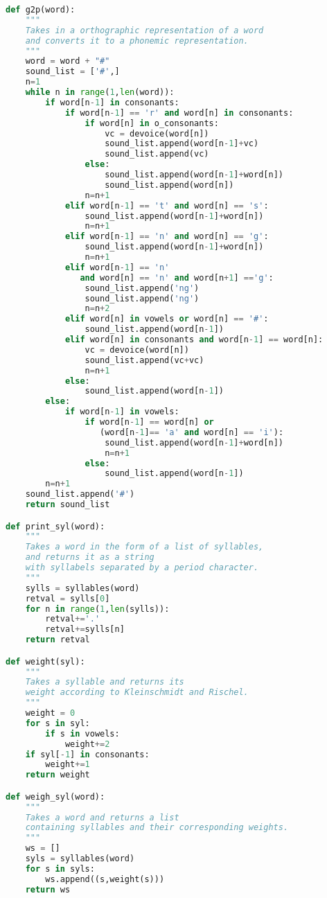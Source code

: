 \documentclass[12pt]{article}
\begin{document}
\begin{lstlisting}[language=Python]
def g2p(word):
    """
    Takes in a orthographic representation of a word
    and converts it to a phonemic representation.
    """
    word = word + "#"
    sound_list = ['#',]
    n=1
    while n in range(1,len(word)):
        if word[n-1] in consonants:
            if word[n-1] == 'r' and word[n] in consonants:
                if word[n] in o_consonants:
                    vc = devoice(word[n])
                    sound_list.append(word[n-1]+vc)
                    sound_list.append(vc)
                else:
                    sound_list.append(word[n-1]+word[n])
                    sound_list.append(word[n])
                n=n+1
            elif word[n-1] == 't' and word[n] == 's':
                sound_list.append(word[n-1]+word[n])
                n=n+1
            elif word[n-1] == 'n' and word[n] == 'g':
                sound_list.append(word[n-1]+word[n])
                n=n+1
            elif word[n-1] == 'n'
               and word[n] == 'n' and word[n+1] =='g':
                sound_list.append('ng')
                sound_list.append('ng')
                n=n+2
            elif word[n] in vowels or word[n] == '#':
                sound_list.append(word[n-1])
            elif word[n] in consonants and word[n-1] == word[n]:
                vc = devoice(word[n])
                sound_list.append(vc+vc)
                n=n+1
            else:
                sound_list.append(word[n-1])
        else:
            if word[n-1] in vowels:
                if word[n-1] == word[n] or
                   (word[n-1]== 'a' and word[n] == 'i'):
                    sound_list.append(word[n-1]+word[n])
                    n=n+1
                else:
                    sound_list.append(word[n-1])
        n=n+1
    sound_list.append('#')
    return sound_list  

def print_syl(word):
    """
    Takes a word in the form of a list of syllables,
    and returns it as a string
    with syllabels separated by a period character.
    """
    sylls = syllables(word)
    retval = sylls[0]
    for n in range(1,len(sylls)):
        retval+='.'
        retval+=sylls[n]
    return retval

def weight(syl):
    """
    Takes a syllable and returns its
    weight according to Kleinschmidt and Rischel.
    """
    weight = 0
    for s in syl:
        if s in vowels:
            weight+=2
    if syl[-1] in consonants:
        weight+=1
    return weight

def weigh_syl(word):
    """
    Takes a word and returns a list
    containing syllables and their corresponding weights.
    """
    ws = []
    syls = syllables(word)
    for s in syls:
        ws.append((s,weight(s)))
    return ws
\end{lstlisting}
\newpage

\printbibliography
\end{document}
